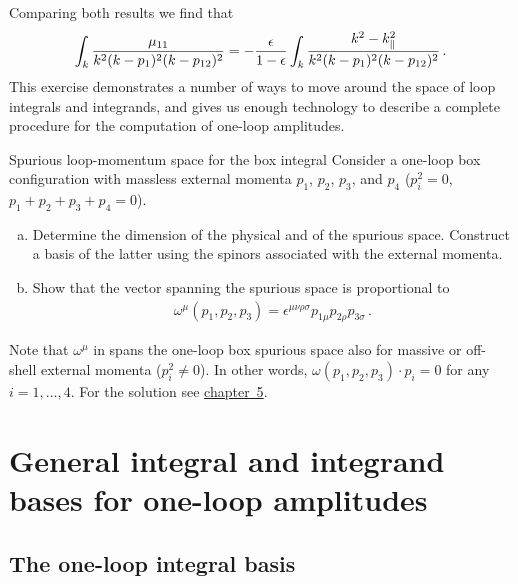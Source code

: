 Comparing both results we find that
\begin{equation}
  \int_k \frac{\mu_{11}}{k^2 (k-p_1)^2 (k-p_{12})^2} = -\frac{\epsilon}{1-\epsilon} \int_k \frac{k^2-k_{\parallel}^2}{k^2 (k-p_1)^2 (k-p_{12})^2}\,.
  \label{eq:mu11triformula}
\end{equation}
This exercise demonstrates a number of ways to move around the space of loop
integrals and integrands, and gives us enough technology to describe a complete
procedure for the computation of one-loop amplitudes.


\begin{exer}{Spurious loop-momentum space for the box integral}
\label{Ex:3.4}
Consider a one-loop box configuration with massless external momenta $p_1$, $p_2$, $p_3$, and $p_4$ ($p_i^2 = 0$, $p_1+p_2+p_3+p_4=0$). 

\begin{enumerate}[a)]
\item Determine the dimension of the physical and of the spurious space. Construct a basis of the latter using the spinors associated with the external momenta.
\smallskip
\item Show that the vector spanning the spurious space is proportional to
\begin{align} \label{eq:omega4pt}
\omega^{\mu}(p_1,p_2,p_3) = \epsilon^{\mu \nu \rho \sigma} p_{1\mu} p_{2\rho} p_{3\sigma} \,. 
\end{align}
\end{enumerate}
\noindent
Note that $\omega^{\mu}$ in  spans the one-loop box spurious space also for massive or off-shell external momenta ($p_i^2 \neq 0$). In other words, $\omega(p_1,p_2,p_3) \cdot p_i = 0$ for any $i=1,\ldots,4$.
For the solution see \hyperref[Sol:3.4]{chapter~5}.
\end{exer}


\section{General integral and integrand bases for one-loop amplitudes \label{sec:3.5}}

\subsection{The one-loop integral basis}

